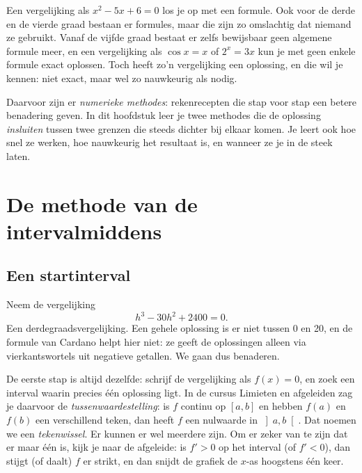 Een vergelijking als $x^2 - 5x + 6 = 0$ los je op met een formule. Ook voor de derde en de vierde graad bestaan er formules, maar die zijn zo omslachtig dat niemand ze gebruikt. Vanaf de vijfde graad bestaat er zelfs bewijsbaar geen algemene formule meer, en een vergelijking als $\cos x = x$ of $2^x = 3x$ kun je met geen enkele formule exact oplossen. Toch heeft zo'n vergelijking een oplossing, en die wil je kennen: niet exact, maar wel zo nauwkeurig als nodig.

Daarvoor zijn er \textit{numerieke methodes}: rekenrecepten die stap voor stap een betere benadering geven. In dit hoofdstuk leer je twee methodes die de oplossing \textit{insluiten} tussen twee grenzen die steeds dichter bij elkaar komen. Je leert ook hoe snel ze werken, hoe nauwkeurig het resultaat is, en wanneer ze je in de steek laten.

\begin{oefeningen}[Start]

\end{oefeningen}


\section{De methode van de intervalmiddens}

\subsection{Een startinterval}

Neem de vergelijking
\[
h^3 - 30h^2 + 2400 = 0 .
\]
Een derdegraadsvergelijking. Een gehele oplossing is er niet tussen 0 en 20, en de formule van Cardano helpt hier niet: ze geeft de oplossingen alleen via vierkantswortels uit negatieve getallen. We gaan dus benaderen.

De eerste stap is altijd dezelfde: schrijf de vergelijking als $f(x) = 0$, en zoek een interval waarin precies één oplossing ligt. In de cursus Limieten en afgeleiden zag je daarvoor de \textit{tussenwaardestelling}: is $f$ continu op $[a, b]$ en hebben $f(a)$ en $f(b)$ een verschillend teken, dan heeft $f$ een nulwaarde in $\left]a, b\right[$. Dat noemen we een \emph{tekenwissel}. Er kunnen er wel meerdere zijn. Om er zeker van te zijn dat er maar één is, kijk je naar de afgeleide: is $f' > 0$ op het interval (of $f' < 0$), dan stijgt (of daalt) $f$ er strikt, en dan snijdt de grafiek de $x$-as hoogstens één keer.


